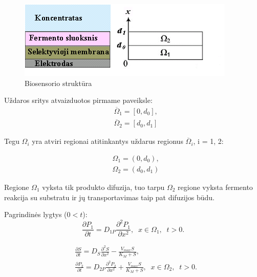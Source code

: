 \documentclass[12pt, a4paper, lithuanian]{article}
\begin{document}
\begin{figure}[H]
    \centering
    \includegraphics[scale=0.9]{img/modv1}
    \caption{Biosensorio struktūra}
    \label{img:mlp}
\end{figure}

Uždaros sritys atvaizduotos pirmame paveiksle:
\begin{equation}
\begin{aligned}
    &\overline{\Omega}_1 = [0, d_0],\\
    &\overline{\Omega}_2 = [d_0, d_1]
\end{aligned}
\end{equation}

Tegu $\Omega_i$ yra atviri regionai atitinkantys uždarus regionus
$\overline{\Omega}_i$, i = 1, 2:

\begin{equation}
\begin{aligned}
    &\Omega_1 = (0, d_0),\\
    &\Omega_2 = (d_0, d_1)
\end{aligned}
\end{equation}

Regione $\Omega_1$ vyksta tik produkto
difuzija, tuo tarpu $\Omega_2$ regione vyksta fermento
reakcija su substratu ir jų transportavimas taip pat difuzijos
būdu.

Pagrindinės lygtys ($0<t$):
\begin{equation}
    \frac{\partial P_1}{\partial t} = D_{1P} \frac{\partial^2 P_1}{\partial x^2}, \;
    \; x \in \Omega_1,\;\; t > 0.
\end{equation}

\begin{equation}
\begin{aligned} 
    &\frac{\partial S}{\partial t} = D_S \frac{\partial^2 S}{\partial x^2} -
    \frac{V_{max} S}{K_M + S},  \\ 
    &\frac{\partial P_2}{\partial t} = D_{2P} \frac{\partial^2 P_2}{\partial x^2} +
    \frac{V_{max} S}{K_M + S}, \; \; x \in \Omega_2 ,\;\; t > 0.
\end{aligned}
\end{equation}
\end{document}

